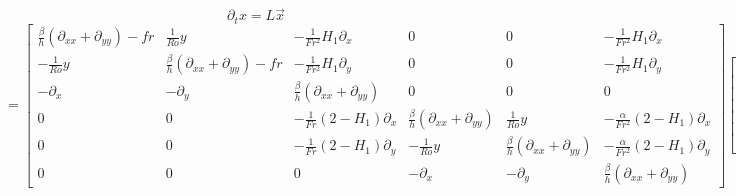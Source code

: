 \documentclass[10pt]{article}
\newcommand{\pd}[1]{\partial_{#1}}
\begin{document}
\[ \pd{t}x = L\vec{x}\]
\[=
\left[\begin{array}{ccc|ccc}
\frac{\beta}{h}(\pd{xx}+\pd{yy})-fr & \frac{1}{Ro}y & -\frac{1}{Fr^2}H_1\pd{x} & 0 & 0 & -\frac{1}{Fr^2} H_1\pd{x} \\
-\frac{1}{Ro}y & \frac{\beta}{h}(\pd{xx}+\pd{yy})-fr  & -\frac{1}{Fr^2}H_1\pd{y} & 0 & 0 & -\frac{1}{Fr^2}H_1\pd{y}\\
-\pd{x} & -\pd{y} & \frac{\beta}{h}(\pd{xx}+\pd{yy})  & 0 & 0 & 0 \\ \hline
0 & 0 & -\frac{1}{Fr}(2-H_1)\pd{x} & \frac{\beta}{h}(\pd{xx}+\pd{yy})  & \frac{1}{Ro}y &  -\frac{\alpha}{Fr^2}(2-H_1)\pd{x} \\
0 & 0 & -\frac{1}{Fr}(2-H_1)\pd{y} & -\frac{1}{Ro}y  & \frac{\beta}{h}(\pd{xx}+\pd{yy}) &  -\frac{\alpha}{Fr^2}(2-H_1)\pd{y} \\
0 & 0 & 0 & -\pd{x} & -\pd{y} & \frac{\beta}{h}(\pd{xx}+\pd{yy}) 
\end{array}\right] \begin{bmatrix}
m_1\\
n_1\\
\eta_1\\
m_2\\
n_2\\
\eta_2
\end{bmatrix}
\]
\end{document}
